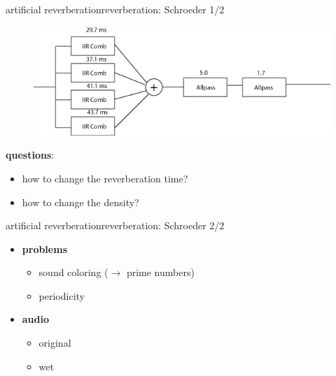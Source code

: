 \begin{frame}{artificial reverberation}{reverberation: Schroeder 1/2}
		\begin{figure}
			\centerline{\includegraphics[scale=.5]{graph/schroeder}}
		\end{figure} 
		
		\pause
		\textbf{questions}:
		\begin{itemize}
			\item	how to change the reverberation time?
			\item	how to change the density?
		\end{itemize}
\end{frame}

\begin{frame}{artificial reverberation}{reverberation: Schroeder 2/2}
    \begin{itemize}
        \item   \textbf{problems}
            \begin{itemize}
                \item	sound coloring ($\rightarrow$ prime numbers)
                \item	periodicity
            \end{itemize}
        \pause
        \bigskip
        \item   \textbf{audio}
            \begin{itemize}
                \item   original 
                \item   wet 
            \end{itemize}
    \end{itemize}
\end{frame}

